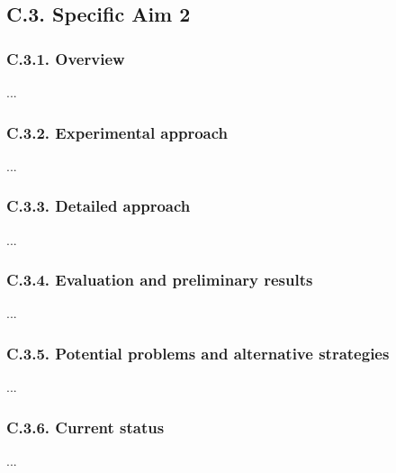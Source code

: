 \subsection{C.3. Specific Aim 2}

\vspace{1cm}
\subsubsection{C.3.1. Overview}

...
\subsubsection{C.3.2. Experimental approach}

...

\subsubsection{C.3.3. Detailed approach}

... 

\subsubsection{C.3.4. Evaluation and preliminary results}

...

\subsubsection{C.3.5. Potential problems and alternative strategies}

...

\subsubsection{C.3.6. Current status}

...